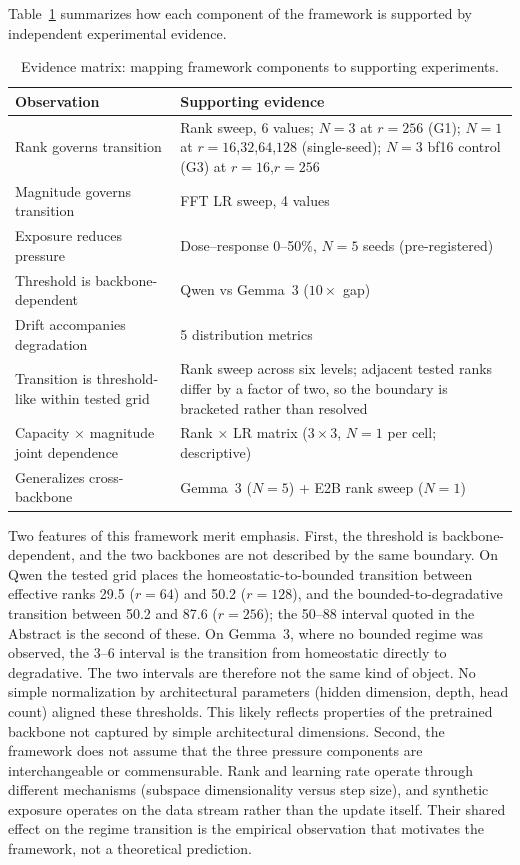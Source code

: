 \documentclass[a4paper,fleqn]{cas-dc}
\newif\ifshowchanges
\newcommand{\rev}[1]{\ifshowchanges{\color{blue}#1}\else{#1}\fi}
\renewcommand{\arraystretch}{1.8}
\begin{document}
Table~\ref{tab:evidence} summarizes how each component of the framework is
supported by independent experimental evidence.

\begin{table}[!htbp]
\caption{Evidence matrix: mapping framework components to supporting
experiments.}\label{tab:evidence}
\footnotesize
\renewcommand{\arraystretch}{1.4}
\begin{tabularx}{\columnwidth}{@{}lX@{}}
\toprule
\textbf{Observation} & \textbf{Supporting evidence} \\
\midrule
Rank governs transition & \rev{Rank sweep, 6 values; $N{=}3$ at $r{=}256$ (G1); $N{=}1$ at $r{=}16$,$32$,$64$,$128$ (single-seed); $N{=}3$ bf16 control (G3) at $r{=}16$,$r{=}256$} \\
\addlinespace
Magnitude governs transition & FFT LR sweep, 4 values \\
\addlinespace
\rev{Exposure reduces pressure} & \rev{Dose--response 0--50\%, $N{=}5$ seeds (pre-registered)} \\
\addlinespace
Threshold is backbone-dependent & Qwen vs Gemma~3 ($10{\times}$ gap) \\
\addlinespace
Drift accompanies degradation & 5 distribution metrics \\
\addlinespace
\rev{Transition is threshold-like within tested grid} & \rev{Rank sweep across six levels; adjacent tested ranks differ by a factor of two, so the boundary is bracketed rather than resolved} \\
\addlinespace
Capacity $\times$ magnitude \rev{joint dependence} & \rev{Rank $\times$ LR matrix ($3{\times}3$, $N=1$ per cell; descriptive)} \\
\addlinespace
Generalizes cross-backbone & Gemma~3 ($N=5$) + \rev{E2B rank sweep ($N=1$)} \\
\bottomrule
\end{tabularx}
\end{table}

Two features of this framework merit emphasis. First, the threshold is backbone-dependent, and the two backbones are
not described by the same boundary. \rev{On Qwen the tested grid places
the homeostatic-to-bounded transition between effective ranks 29.5
($r=64$) and 50.2 ($r=128$), and the bounded-to-degradative transition
between 50.2 and 87.6 ($r=256$); the 50--88 interval quoted in the
Abstract is the second of these. On Gemma~3, where no bounded regime
was observed, the 3--6 interval is the transition from homeostatic
directly to degradative. The two intervals are therefore not the same
kind of object.}
No simple normalization by architectural
parameters (hidden dimension, depth, head count) aligned these thresholds. This
likely reflects properties of the pretrained backbone not captured by simple
architectural dimensions. Second, the framework does not assume that the three
pressure components are interchangeable or commensurable. Rank and learning rate
operate through different mechanisms (subspace dimensionality versus step size),
and synthetic exposure operates on the data stream rather than the update
itself. Their shared effect on the regime transition is the empirical
observation that motivates the framework, not a theoretical prediction.
\end{document}
